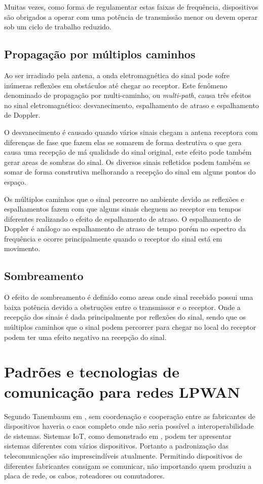 Muitas vezes, como forma de regulamentar estas faixas de frequência, dispositivos são obrigados a operar com uma potência de transmissão menor ou devem operar sob um ciclo de trabalho reduzido.

\subsection*{Propagação por múltiplos caminhos}
Ao ser irradiado pela antena, a onda eletromagnética do sinal pode sofre inúmeras reflexões em obstáculos até chegar ao receptor. Este fenômeno denominado de propagação por multi-caminho, ou \emph{multi-path}, causa três efeitos no sinal eletromagnético: desvanecimento, espalhamento de atraso e espalhamento de Doppler.

O desvanecimento é causado quando vários sinais chegam a antena receptora com diferenças de fase que fazem elas se somarem de forma destrutiva o que gera causa uma recepção de má qualidade do sinal original, este efeito pode também gerar areas de sombras do sinal. Os diversos sinais refletidos podem também se somar de forma construtiva melhorando a recepção do sinal em alguns pontos do espaço.

Os múltiplos caminhos que o sinal percorre no ambiente devido as reflexões e espalhamentos fazem com que alguns sinais cheguem ao receptor em tempos diferentes realizando o efeito de espalhamento de atraso. O espalhamento de Doppler é análogo ao espalhamento de atraso de tempo porém no espectro da frequência e ocorre principalmente quando o receptor do sinal está em movimento.


\subsection*{Sombreamento}
O efeito de sombreamento é definido como areas onde sinal recebido possui uma baixa potência devido a obstruções entre o transmissor e o receptor. Onde a recepção dos sinais é dada principalmente por reflexões do sinal, sendo que os múltiplos caminhos que o sinal podem percorrer para chegar no local do receptor podem ter uma efeito negativo na recepção do sinal.


\section{Padrões e tecnologias de comunicação para redes LPWAN}
\label{padrõesSF}
Segundo Tanembaum em \cite{tanembaum2011}, sem coordenação e cooperação entre as fabricantes de dispositivos haveria o caos completo onde não seria possível a interoperabilidade de sistemas. Sistemas IoT, como demonstrado em \cite{sotres2017practical}, podem ter apresentar sistemas diferentes com vários dispositivos. Portanto a padronização das telecomunicações são imprescindíveis atualmente. Permitindo dispositivos de diferentes fabricantes consigam se comunicar, não importando quem produziu a placa de rede, os cabos, roteadores ou comutadores.

